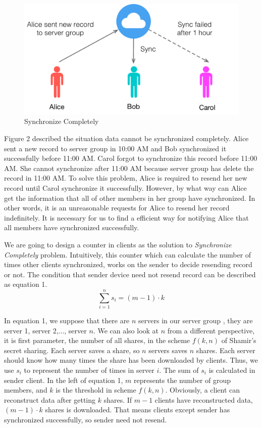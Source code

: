 \documentclass[twocolumn,10pt]{article}
\begin{document}
\begin{figure}[t]
\centering
\includegraphics[scale=0.4]{sync_completely}
\caption{Synchronize Completely}
\end{figure}

Figure 2 described the situation data cannot be synchronized completely. Alice sent a new record to server group in 10:00 AM and Bob synchronized it successfully before 11:00 AM. Carol forgot to synchronize this record before 11:00 AM. She cannot synchronize after 11:00 AM because server group has delete the record in 11:00 AM. To solve this problem, Alice is required to resend her new record until Carol synchronize it successfully. However, by what way can Alice get the information that all of other members in her group have synchronized. In other words, it is an unreasonable requests for Alice to resend her record indefinitely. It is necessary for us to find a efficient way for notifying Alice that all members have synchronized successfully.

We are going to design a counter in clients as the solution to \emph{Synchronize Completely} problem. Intuitively, this counter which can calculate the number of times other clients synchronized, works on the sender to decide resending record or not. The condition that sender device need not resend record can be described as equation 1.
\begin{equation}
\sum_{i=1}^{n}s_{i}=(m-1)\cdot k
\end{equation}

In equation 1, we suppose that there are $n$ servers in our server group , they are server 1, server 2,..., server $n$. We can also look at $n$ from a different perspective, it is first parameter, the number of all shares, in the scheme $f(k, n)$ of Shamir's secret sharing. Each server saves a share, so $n$ servers saves $n$ shares. Each server should know how many times the share has been downloaded by clients. Thus, we use $s_i$ to represent the number of times in server $i$. The sum of $s_i$ is calculated in sender client. In the left of equation 1, $m$ represents the number of group members, and $k$ is the threshold in scheme $f(k, n)$. Obviously, a client can reconstruct data after getting $k$ shares. If $m-1$ clients have reconstructed data, $(m-1)\cdot k$ shares is downloaded. That means clients except sender has synchronized successfully, so sender need not resend.
\end{document}
